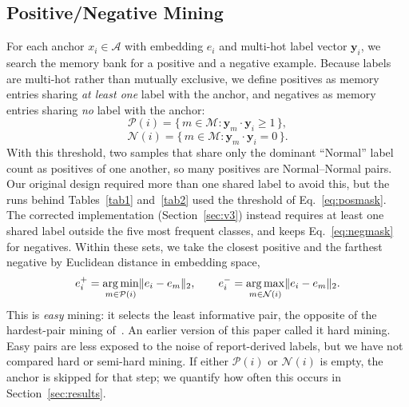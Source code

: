 \documentclass[conference]{IEEEtran}
\begin{document}
\subsection{Positive/Negative Mining}
\label{sec:mining}
For each anchor $x_i \in \mathcal{A}$ with embedding $e_i$ and multi-hot label vector $\mathbf{y}_i$, we search the memory bank for a positive and a negative example. Because labels are multi-hot rather than mutually exclusive, we define positives as memory entries sharing \emph{at least one} label with the anchor, and negatives as memory entries sharing \emph{no} label with the anchor:
\begin{equation}
\mathcal{P}(i) = \{\, m \in \mathcal{M} : \mathbf{y}_m \cdot \mathbf{y}_i \ge 1 \,\},
\label{eq:posmask}
\end{equation}
\begin{equation}
\mathcal{N}(i) = \{\, m \in \mathcal{M} : \mathbf{y}_m \cdot \mathbf{y}_i = 0 \,\}.
\label{eq:negmask}
\end{equation}
With this threshold, two samples that share only the dominant ``Normal'' label count as positives of one another, so many positives are Normal--Normal pairs. Our original design required more than one shared label to avoid this, but the runs behind Tables~\ref{tab1} and~\ref{tab2} used the threshold of Eq.~\ref{eq:posmask}. The corrected implementation (Section~\ref{sec:v3}) instead requires at least one shared label outside the five most frequent classes, and keeps Eq.~\ref{eq:negmask} for negatives. Within these sets, we take the closest positive and the farthest negative by Euclidean distance in embedding space,
\begin{equation}
e_i^{+} = \operatornamewithlimits{arg\,min}_{m \in \mathcal{P}(i)} \lVert e_i - e_m \rVert_2, \qquad
e_i^{-} = \operatornamewithlimits{arg\,max}_{m \in \mathcal{N}(i)} \lVert e_i - e_m \rVert_2.
\label{eq:hardmine}
\end{equation}
This is \emph{easy} mining: it selects the least informative pair, the opposite of the hardest-pair mining of~\cite{b5}. An earlier version of this paper called it hard mining. Easy pairs are less exposed to the noise of report-derived labels, but we have not compared hard or semi-hard mining. If either $\mathcal{P}(i)$ or $\mathcal{N}(i)$ is empty, the anchor is skipped for that step; we quantify how often this occurs in Section~\ref{sec:results}.
\end{document}
